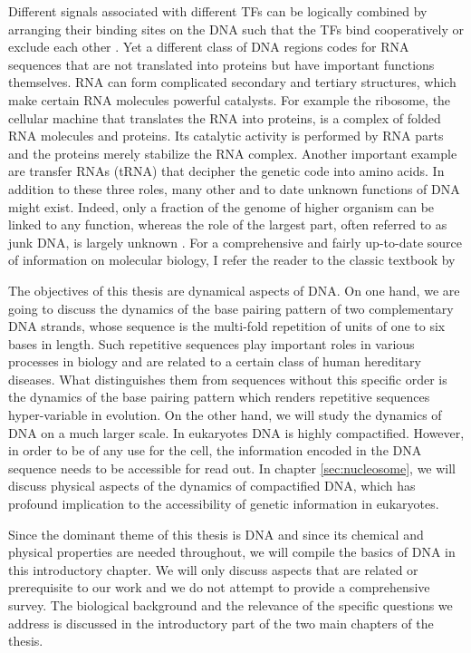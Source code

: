 Different signals associated with different TFs can be logically combined by arranging their binding
sites on the DNA such that the TFs bind cooperatively or exclude each other \cite{Gerland_PNAS_02, Buchler_PNAS_03}.
Yet a different class of DNA regions codes for RNA sequences that are not translated into
proteins but have important functions themselves. RNA can form complicated 
secondary and tertiary structures, which make certain RNA molecules powerful catalysts.  
For example the ribosome, the cellular machine that translates the RNA into proteins, 
is a complex of folded RNA molecules and proteins. Its catalytic activity is performed by RNA parts and the 
proteins merely stabilize the RNA complex. Another important example are transfer RNAs (tRNA)
that decipher the genetic code into amino acids. 
%
In addition to these three roles, many other and to date unknown functions of DNA might exist.
Indeed, only a fraction of the genome of higher organism can be linked to any function,
whereas the role of the largest part, often referred to as junk DNA, is largely unknown \cite{HumanGenome_Nature_01}. 
For a comprehensive and fairly up-to-date source of information on molecular biology, I refer the reader to 
the classic textbook by \citeauthor{Alberts_02}

The objectives of this thesis are dynamical aspects of DNA. On one hand, we are going
to discuss the dynamics of the base pairing pattern of two complementary 
DNA strands, whose sequence is the multi-fold repetition of units of one to six
bases in length. Such repetitive sequences play important roles in various processes in biology and 
are related to a certain class of human hereditary diseases. 
What distinguishes them from sequences without this specific order is the dynamics of the 
base pairing pattern which renders repetitive sequences hyper-variable in evolution.
On the other hand, we will study the dynamics of DNA on a much larger scale. 
In eukaryotes DNA is highly compactified. However, in order
to be of any use for the cell, the information encoded in the DNA sequence needs
to be accessible for read out. In chapter \ref{sec:nucleosome}, we will discuss physical aspects of the dynamics of 
compactified DNA, which has profound implication to the accessibility of genetic 
information in eukaryotes.

Since the dominant theme of this thesis is DNA and since its chemical and
physical properties are needed throughout, we will
compile the basics of DNA in this introductory chapter. 
We will only discuss aspects that are related or prerequisite 
to our work and we do not attempt to provide a comprehensive survey. 
The biological background and the relevance of the specific questions we address is discussed in the 
introductory part of the two main chapters of the thesis. 

